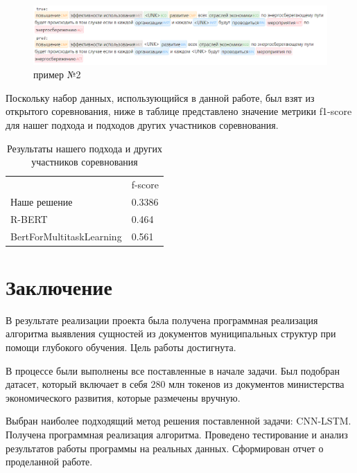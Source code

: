 \documentclass{article}
\begin{document}
\begin{figure}[!tbh]
    \centering
    \includegraphics[width=0.9\linewidth]{exm2.png}
    \caption{пример №2}
    \label{fig:circle}
\end{figure}
 Поскольку набор данных, использующийся в данной работе, был взят из открытого соревнования, ниже в таблице представлено значение метрики f1-score для нашег подхода и подходов других участников соревнования.
\begin{table}[tbh!]
    \centering
    \begin{tabular}[t]{l|l}
         &  f-score\\
        Наше решение & 0.3386\\
        R-BERT & 0.464 \\
        BertForMultitaskLearning & 0.561 \\
    \end{tabular}
    \caption{Результаты нашего подхода и других участников соревнования}
\end{table}


\section{Заключение}
В результате реализации проекта была получена программная реализация алгоритма выявления сущностей из документов муниципальных структур при помощи глубокого обучения. Цель работы достигнута. 

В процессе были выполнены все поставленные в начале задачи.  Был подобран датасет, который включает в себя 280 млн токенов из документов министерства экономического развития, которые размечены вручную.

 Выбран наиболее подходящий метод решения поставленной задачи: CNN-LSTM.
Получена программная реализация алгоритма. Проведено тестирование и анализ результатов работы программы на реальных данных. Сформирован отчет о проделанной работе.


\end{document}
